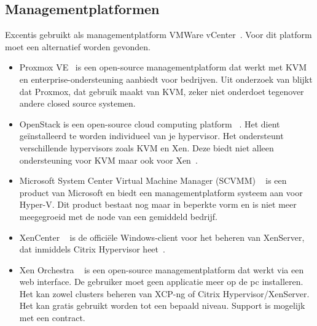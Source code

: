 \subsection{Managementplatformen}\label{subsec:managementplatformen}
Excentis gebruikt als managementplatform VMWare vCenter~\autocite{vmware}. Voor dit platform moet een alternatief worden gevonden.

\begin{itemize}
    \item Proxmox VE~\autocite{Proxmox} is een open-source managementplatform dat werkt met KVM en enterprise-ondersteuning aanbiedt voor bedrijven. Uit onderzoek van \textcite{ally2018comparative} blijkt dat Proxmox, dat gebruik maakt van KVM, zeker niet onderdoet tegenover andere closed source systemen.

    \item OpenStack is een open-source cloud computing platform ~\autocite{openstack2024}. Het dient geïnstalleerd te worden individueel van je hypervisor. Het ondersteunt verschillende hypervisors zoals KVM en Xen. Deze biedt niet alleen ondersteuning voor KVM maar ook voor Xen~\autocite{oleksiuk2023comparative}.

    \item Microsoft System Center Virtual Machine Manager (SCVMM) ~\autocite{microsoftvmm2025} is een product van Microsoft en biedt een managementplatform systeem aan voor Hyper-V. Dit product bestaat nog maar in beperkte vorm en is niet meer meegegroeid met de node van een gemiddeld bedrijf.

    \item XenCenter ~\autocite{xencenter2024} is de officiële Windows‑client voor het beheren van XenServer, dat inmiddels Citrix Hypervisor heet~\autocite{xenserverwebsite}.

    \item Xen Orchestra ~\autocite{el2021server} is een open-source managementplatform dat werkt via een web interface. De gebruiker moet geen applicatie meer op de pc installeren. Het kan zowel clusters beheren van XCP-ng of Citrix Hypervisor/XenServer. Het kan gratis gebruikt worden tot een bepaald niveau. Support is mogelijk met een contract.
\end{itemize}
